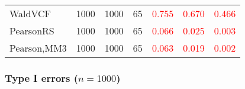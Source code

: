 \documentclass[
]{article}
\begin{document}
\begin{table}[H]
{\begin{tabular}[t]{lrrrrrr}
\hspace{1em}WaldVCF & 1000 & 1000 & 65 & \textcolor{red}{0.755} & \textcolor{red}{0.670} & \textcolor{red}{0.466}\\
\hspace{1em}PearsonRS & 1000 & 1000 & 65 & \textcolor{red}{0.066} & \textcolor{red}{0.025} & \textcolor{red}{0.003}\\
\hspace{1em}Pearson,MM3 & 1000 & 1000 & 65 & \textcolor{red}{0.063} & \textcolor{red}{0.019} & \textcolor{red}{0.002}\\
\bottomrule
\end{tabular}}
\endgroup{}
\end{table}

\hypertarget{type-i-errors-n1000-1}{%
\subsubsection{\texorpdfstring{Type I errors
(\(n=1000\))}{Type I errors (n=1000)}}\label{type-i-errors-n1000-1}}
\end{document}
